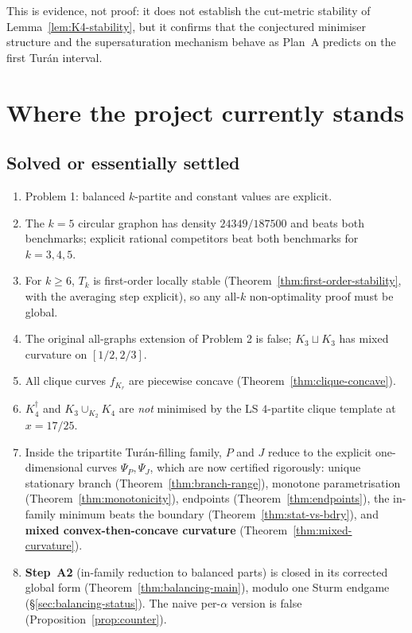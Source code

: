 \documentclass[11pt]{amsart}
\theoremstyle{definition}
\newcommand{\1}{\mathbf 1}
\begin{document}
This is evidence, not proof: it does not establish the cut-metric stability of
Lemma~\ref{lem:K4-stability}, but it confirms that the conjectured minimiser
structure and the supersaturation mechanism behave as Plan~A predicts on the
first Tur\'an interval.

\section{Where the project currently stands}
\label{sec:status}

\subsection{Solved or essentially settled}

\begin{enumerate}[label=(\arabic*),itemsep=2pt]
\item Problem 1: balanced $k$-partite and constant values are explicit.
\item The $k=5$ circular graphon has density $24349/187500$ and beats both
benchmarks; explicit rational competitors beat both benchmarks for $k=3,4,5$.
\item For $k\ge 6$, $T_k$ is first-order locally stable
(Theorem~\ref{thm:first-order-stability}, with the averaging step explicit), so
any all-$k$ non-optimality proof must be global.
\item The original all-graphs extension of Problem 2 is false; $K_3\sqcup K_3$
has mixed curvature on $[1/2,2/3]$.
\item All clique curves $f_{K_r}$ are piecewise concave
(Theorem~\ref{thm:clique-concave}).
\item $K_4^\dagger$ and $K_3\cup_{K_2}K_4$ are \emph{not} minimised by the LS
$4$-partite clique template at $x=17/25$.
\item Inside the tripartite Tur\'an-filling family, $P$ and $J$ reduce to the
explicit one-dimensional curves $\Psi_P,\Psi_J$, which are now certified rigorously:
unique stationary branch (Theorem~\ref{thm:branch-range}), monotone
parametrisation (Theorem~\ref{thm:monotonicity}), endpoints
(Theorem~\ref{thm:endpoints}), the in-family minimum beats the boundary
(Theorem~\ref{thm:stat-vs-bdry}), and \textbf{mixed convex-then-concave
curvature} (Theorem~\ref{thm:mixed-curvature}).
\item \textbf{Step~A2} (in-family reduction to balanced parts) is closed in its
corrected global form (Theorem~\ref{thm:balancing-main}), modulo one Sturm
endgame (\S\ref{sec:balancing-status}).  The naive per-$\alpha$ version is false
(Proposition~\ref{prop:counter}).
\end{enumerate}
\end{document}
